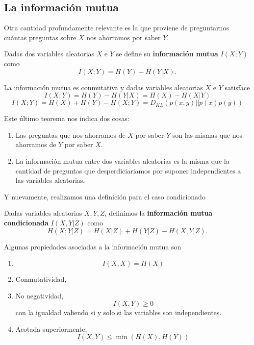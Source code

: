 \subsection{La informaci\'on mutua}
Otra cantidad profundamente relevante es la que proviene de preguntarnos cu\'antas preguntas sobre $X$ nos ahorramos por saber $Y$.
\begin{definition}
    Dadas dos variables aleatorias $X$ e $Y$ se define su {\bf informaci\'on mutua} $I(X;Y)$ como
    \begin{equation}
        I(X;Y) = H(Y) -H(Y|X).
    \end{equation}
\end{definition}
\begin{theorem}
    La informaci\'on mutua es conmutativa y dadas variables aleatorias $X$ e $Y$ satisface
    \begin{equation}
        I(X;Y) = H(Y) - H(Y|X) = H(X) - H(X|Y)
    \end{equation}
    \begin{equation}
        I(X;Y) = H(X)+H(Y) - H(X;Y) = D_{KL}(p(x,y)||p(x) p(y))
    \end{equation}
\end{theorem}
Este \'ultimo teorema nos indica dos cosas:
\begin{enumerate}
    \item Las preguntas que nos ahorramos de $X$ por saber $Y$ son las mismas que nos ahorramos de $Y$ por saber $X$.
    \item La informaci\'on mutua entre dos variables aleatorias es la misma que la cantidad de preguntas que desperdiciariamos por suponer independientes a las variables aleatorias.
\end{enumerate}
Y nuevamente, realizamos una definici\'on para el caso condicionado
\begin{definition}
    Dadas variables aleatorias $X, Y, Z$, definimos la {\bf informaci\'on mutua condicionada} $I(X,Y|Z)$ como
    \begin{equation}
        H(X;Y|Z) = H(X|Z) + H(Y|Z) -H(X,Y|Z).
    \end{equation}
\end{definition}
\begin{theorem}
    Algunas propiedades asociadas a la informaci\'on mutua son
    \begin{enumerate}
        \item
        \begin{equation}
            I(X,X) = H(X)
        \end{equation}
        \item Conmutatividad,
        \item No negatividad,
        \begin{equation}
            I(X,Y) \geq 0
        \end{equation}
        con la igualdad valiendo si y solo si las variables son independientes.
        \item Acotada superiormente,
        \begin{equation}
            I(X,Y) \leq \min (H(X),H(Y))
        \end{equation}
    \end{enumerate}
\end{theorem}
